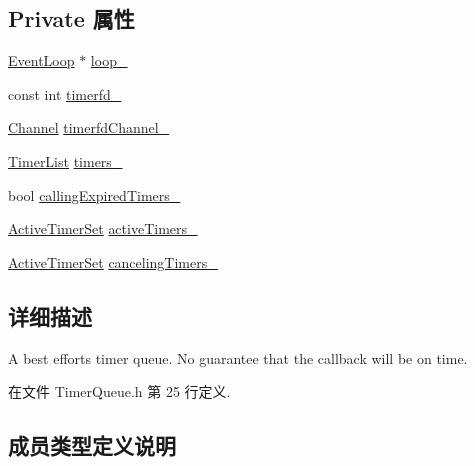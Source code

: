 \subsection*{Private 属性}
\begin{DoxyCompactItemize}
\item 
\hyperlink{classmuduo_1_1EventLoop}{Event\+Loop} $\ast$ \hyperlink{classmuduo_1_1TimerQueue_a19968f50018d32ac31f5cba0195591ac}{loop\+\_\+}
\item 
const int \hyperlink{classmuduo_1_1TimerQueue_acf759a4fb3d6057907231d57dabc92a1}{timerfd\+\_\+}
\item 
\hyperlink{classmuduo_1_1Channel}{Channel} \hyperlink{classmuduo_1_1TimerQueue_a5f622e650258ae6484bc627f816a1650}{timerfd\+Channel\+\_\+}
\item 
\hyperlink{classmuduo_1_1TimerQueue_aeb83ff8eddb4b17cb88a9c3dab7268a2}{Timer\+List} \hyperlink{classmuduo_1_1TimerQueue_a8fe653e82ce7b6c7135163d91a8a7602}{timers\+\_\+}
\item 
bool \hyperlink{classmuduo_1_1TimerQueue_a720fc1742c7b356dfd83f016ff5a219f}{calling\+Expired\+Timers\+\_\+}
\item 
\hyperlink{classmuduo_1_1TimerQueue_ac4562f9443eea7ea7d16c2eab2dad988}{Active\+Timer\+Set} \hyperlink{classmuduo_1_1TimerQueue_a72047415bfa49f1d3d949115c01479fc}{active\+Timers\+\_\+}
\item 
\hyperlink{classmuduo_1_1TimerQueue_ac4562f9443eea7ea7d16c2eab2dad988}{Active\+Timer\+Set} \hyperlink{classmuduo_1_1TimerQueue_a6e9e871b80d9b78c3a1d4c45a7235198}{canceling\+Timers\+\_\+}
\end{DoxyCompactItemize}


\subsection{详细描述}
A best efforts timer queue. No guarantee that the callback will be on time. 

在文件 Timer\+Queue.\+h 第 25 行定义.



\subsection{成员类型定义说明}
\mbox{\label{classmuduo_1_1TimerQueue_a8559b2c5a91f664c629dc1292d484e16}} 
